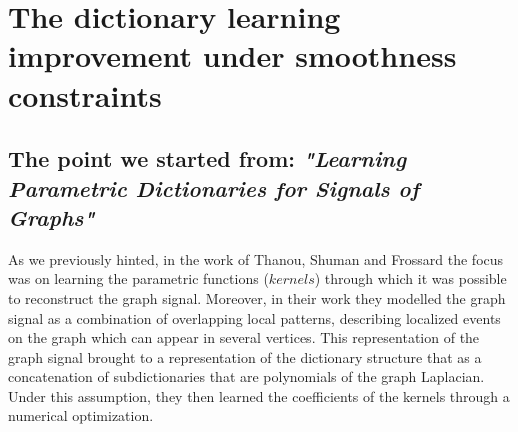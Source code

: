 \chapter{The dictionary learning improvement under smoothness constraints}
\section{The point we started from: \textit{"Learning Parametric Dictionaries for Signals of Graphs"}}
As we previously hinted, in the work of Thanou, Shuman and Frossard the focus was on learning the parametric functions ($kernels$) through which it was possible to reconstruct the graph signal. Moreover, in their work they modelled the graph signal as a combination of overlapping local patterns, describing localized events on the graph which can appear in several vertices. This representation of the graph signal brought to a representation of the dictionary structure that as a concatenation of subdictionaries that are polynomials of the graph Laplacian. Under this assumption, they then learned the coefficients of the kernels through a numerical optimization.

